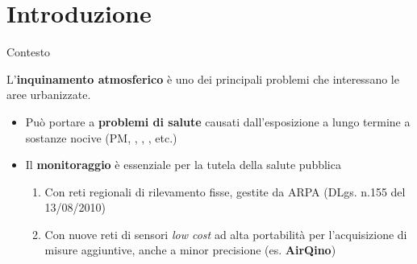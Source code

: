 \section{Introduzione}
\begin{frame}{Contesto}

L’\textbf{inquinamento atmosferico} è uno dei principali problemi che interessano le aree urbanizzate.
\vspace{0.3cm}
\begin{itemize}
 \item Può portare a \textbf{problemi di salute} causati dall’esposizione a lungo termine a sostanze nocive (PM, , , , etc.)\vspace{0.3cm}
 \item Il \textbf{monitoraggio} è essenziale per la tutela della salute pubblica\vspace{-.3cm}
 \begin{enumerate}
 \item Con reti regionali di rilevamento fisse, gestite da ARPA (DLgs. n.155 del 13/08/2010)\vspace{0.1cm}
 \item Con nuove reti di sensori \textit{low cost} ad alta portabilità per l'acquisizione di misure aggiuntive, anche a minor precisione (es. \textbf{AirQino})
\end{enumerate}
\end{itemize}

\end{frame}

